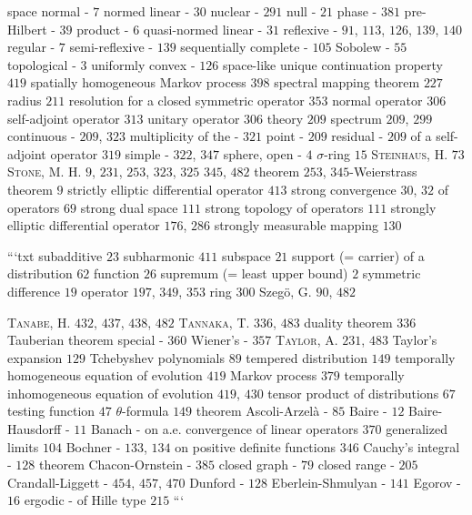 space normal - $7$ normed linear - $30$ nuclear - $291$ null - $21$ phase - $381$ pre-Hilbert - $39$ product - $6$ quasi-normed linear - $31$ reflexive - $91$, $113$, $126$, $139$, $140$ regular - $7$ semi-reflexive - $139$ sequentially complete - $105$ Sobolew - $55$ topological - $3$ uniformly convex - $126$ space-like unique continuation property $419$ spatially homogeneous Markov process $398$ spectral mapping theorem $227$ radius $211$ resolution for a closed symmetric operator $353$ normal operator $306$ self-adjoint operator $313$ unitary operator $306$ theory $209$ spectrum $209$, $299$ continuous - $209$, $323$ multiplicity of the - $321$ point - $209$ residual - $209$ of a self-adjoint operator $319$ simple - $322$, $347$ sphere, open - $4$ $\sigma$-ring $15$ \textsc{Steinhaus}, H. $73$ \textsc{Stone}, M. H. $9$, $231$, $253$, $323$, $325$ $345$, $482$ theorem $253$, $345$-Weierstrass theorem $9$ strictly elliptic differential operator $413$ strong convergence $30$, $32$ of operators $69$ strong dual space $111$ strong topology of operators $111$ strongly elliptic differential operator $176$, $286$ strongly measurable mapping $130$ 

```txt subadditive $23$ subharmonic $411$ subspace $21$ support (= carrier) of a distribution $62$ function $26$ supremum (= least upper bound) $2$ symmetric difference $19$ operator $197$, $349$, $353$ ring $300$ Szegö, G. $90$, $482$

\textsc{Tanabe}, H. $432$, $437$, $438$, $482$ \textsc{Tannaka}, T. $336$, $483$ duality theorem $336$ Tauberian theorem special - $360$ Wiener's - $357$ \textsc{Taylor}, A. $231$, $483$ Taylor's expansion $129$ Tchebyshev polynomials $89$ tempered distribution $149$ temporally homogeneous equation of evolution $419$ Markov process $379$ temporally inhomogeneous equation of evolution $419$, $430$ tensor product of distributions $67$ testing function $47$ $\theta$-formula $149$ theorem Ascoli-Arzelà - $85$ Baire - $12$ Baire-Hausdorff - $11$ Banach - on a.e. convergence of linear operators $370$ generalized limits $104$ Bochner - $133$, $134$ on positive definite functions $346$ Cauchy's integral - $128$ theorem Chacon-Ornstein - $385$ closed graph - $79$ closed range - $205$ Crandall-Liggett - $454$, $457$, $470$ Dunford - $128$ Eberlein-Shmulyan - $141$ Egorov - $16$ ergodic - of Hille type $215$ ```

